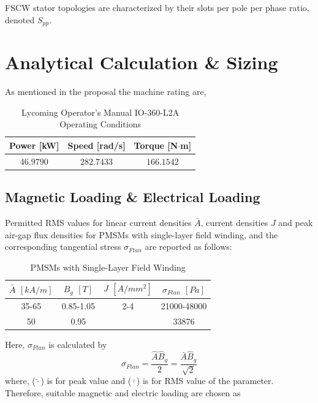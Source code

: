 \documentclass [a4 paper, 11pt, titlepage] {article}
\begin{document}
	
	
	
	
	
	
	
	
	
	
	
	FSCW stator topologies are characterized by their slots per pole per phase ratio, denoted $S_{pp}$\cite{farshadnia_advanced_2018}. 
	
	
	
	
	
	
	\section{Analytical Calculation \& Sizing}
	As mentioned in the proposal the machine rating are,
	\begin{table}[h]
		\begin{center}
			\begin{tabular}{c|c|c}
				Power [kW] &  Speed [rad/s] &  Torque [N$\cdot$m]\\
				\hline
				$46.9790$ & $282.7433$ & $166.1542$
			\end{tabular}
		\end{center}
		\caption{Lycoming Operator's Manual IO-360-L2A Operating Conditions}
		\label{fig:EMoperations}
	\end{table}
	

	
	\subsection{Magnetic Loading \& Electrical Loading}
	Permitted RMS values for linear current densities $\bar{A}$, current densities $J$ and peak air-gap flux densities for PMSMs with single-layer field winding, and the corresponding tangential stress $\sigma_{Ftan}$ are reported as follows:
	\begin{table}[h]
		\begin{center}
			\begin{tabular}{c|c|c||c}
				$\bar{A}$ $[kA/m]$ & $\hat{B}_g$ $[T]$ & $J$ $[A/mm^2]$ & $\sigma_{Ftan}$ $[Pa]$ \\
				\hline
				35-65 &  0.85-1.05 & 2-4 & 21000-48000\\
				50 &  0.95 &  & 33876\\
			\end{tabular}
		\end{center}
		\caption{PMSMs with Single-Layer Field Winding }
		\label{fig:EMoperations}
	\end{table}
	Here, $\sigma_{Ftan}$ is calculated by
	\begin{equation}
		\sigma_{Ftan}=\frac{\hat{A}\hat{B}_g}{2}=\frac{\bar{A}\hat{B}_g}{\sqrt{2}}
	\end{equation}
	where, ($\hat{\cdot}$) is for peak value and ($\bar{\cdot}$) is for RMS value of the parameter.
	Therefore, suitable magnetic and electric loading are chosen as
	
\end{document}
